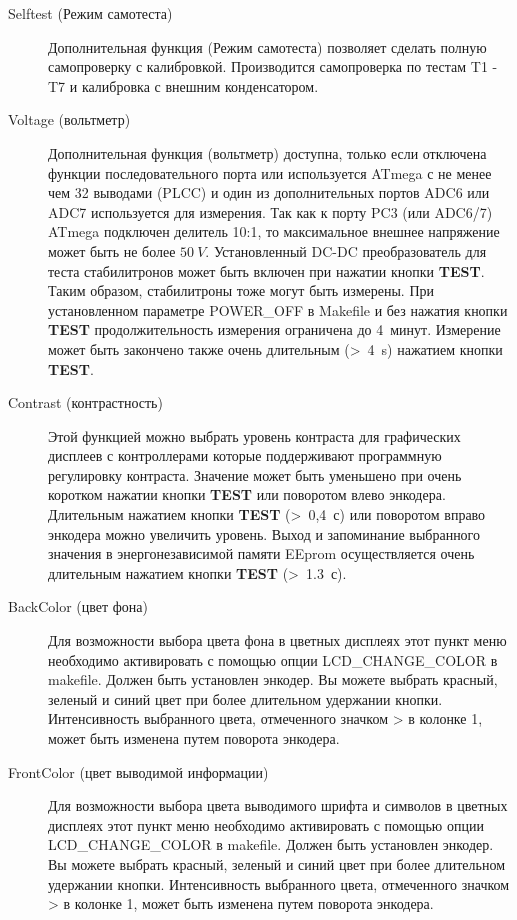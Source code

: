 \begin{description}
 \item[Selftest (Режим самотеста)]
 Дополнительная функция  (Режим самотеста) позволяет сделать полную самопроверку с калибровкой.
Производится самопроверка по тестам T1 - T7 и калибровка с внешним конденсатором.\\

 \item[Voltage (вольтметр)]
 Дополнительная функция  (вольтметр) доступна, только если отключена функции последовательного порта 
или используется ATmega с не менее чем 32 выводами (PLCC) и один из дополнительных портов ADC6 или ADC7 используется 
для измерения. 
Так как к порту PC3 (или ADC6/7) ATmega подключен делитель 10:1, то максимальное внешнее напряжение может быть не более \(50~V\).
Установленный DC-DC преобразователь для теста стабилитронов может быть включен при нажатии кнопки \textbf{ TEST}.
Таким образом, стабилитроны тоже могут быть измерены.
При установленном параметре POWER\_OFF в Makefile и без нажатия кнопки \textbf{ TEST} продолжительность измерения ограничена до 4~минут.
Измерение может быть закончено также очень длительным (\textgreater~4~s) нажатием кнопки \textbf{ TEST}.\\ 

 \item[Contrast (контрастность)]
Этой функцией можно выбрать уровень контраста для графических дисплеев с контроллерами которые поддерживают 
программную регулировку контраста.
Значение может быть уменьшено при очень коротком нажатии кнопки \textbf{ TEST} или поворотом влево энкодера.
Длительным нажатием кнопки \textbf{ TEST} (\textgreater~0,4~с) или поворотом вправо энкодера можно увеличить уровень.
Выход и запоминание выбранного значения в энергонезависимой памяти EEprom осуществляется
очень длительным нажатием кнопки \textbf{ TEST} (\textgreater~1.3~с).\\

 \item[BackColor (цвет фона)]
Для возможности выбора цвета фона в цветных дисплеях этот пункт меню необходимо активировать с помощью 
опции LCD\_CHANGE\_COLOR в makefile.
Должен быть установлен энкодер.
Вы можете выбрать красный, зеленый и синий цвет при более длительном удержании кнопки.
Интенсивность выбранного цвета, отмеченного значком > в колонке 1, может быть изменена путем поворота энкодера.\\

 \item[FrontColor (цвет выводимой информации)]
Для возможности выбора цвета выводимого шрифта и символов в цветных дисплеях этот пункт меню необходимо активировать 
с помощью опции LCD\_CHANGE\_COLOR в makefile.
Должен быть установлен энкодер.
Вы можете выбрать красный, зеленый и синий цвет при более длительном удержании кнопки.
Интенсивность выбранного цвета, отмеченного значком > в колонке 1, может быть изменена путем поворота энкодера.\\


\end{description}
